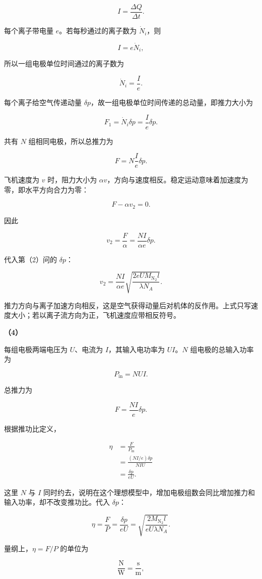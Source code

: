 \documentclass[12pt,a4paper,UTF8]{ctexart}
\begin{document}
\[I=\frac{\Delta Q}{\Delta t}.\]

每个离子带电量 \(e\)。若每秒通过的离子数为 \(\dot N_i\)，则

\[I=e\dot N_i,\]

所以一组电极单位时间通过的离子数为

\[\dot N_i=\frac Ie.\]

每个离子给空气传递动量
\(\delta p\)，故一组电极单位时间传递的总动量，即推力大小为

\[F_1=\dot N_i\delta p=\frac Ie\delta p.\]

共有 \(N\) 组相同电极，所以总推力为

\[F=N\frac{I}{e}\delta p.\]

飞机速度为 \(v\) 时，阻力大小为
\(\alpha v\)，方向与速度相反。稳定运动意味着加速度为零，即水平方向合力为零：

\[F-\alpha v_2=0.\]

因此

\[v_2=\frac F\alpha
=\frac{NI}{\alpha e}\delta p.\]

代入第（2）问的 \(\delta p\)：

\[\boxed{
v_2=\frac{NI}{\alpha e}
\sqrt{\frac{2eUM_{\mathrm{N_2}}l}{\lambda N_A}}
}.\]

推力方向与离子加速方向相反，这是空气获得动量后对机体的反作用。上式只写速度大小；若以离子流方向为正，飞机速度应带相反符号。

\textbf{（4）}

每组电极两端电压为 \(U\)、电流为 \(I\)，其输入电功率为 \(UI\)。\(N\)
组电极的总输入功率为

\[P_{\mathrm{in}}=NUI.\]

总推力为

\[F=\frac{NI}{e}\delta p.\]

根据推功比定义，

\[\begin{aligned}
\eta
&=\frac{F}{P_{\mathrm{in}}}\\
&=\frac{(NI/e)\delta p}{NIU}\\
&=\frac{\delta p}{eU}.
\end{aligned}\]

这里 \(N\) 与 \(I\)
同时约去，说明在这个理想模型中，增加电极组数会同比增加推力和输入功率，却不改变推功比。代入
\(\delta p\)：

\[\eta=\frac{F}{P}
=\frac{\delta p}{eU}
=\boxed{\sqrt{\frac{2M_{\mathrm{N_2}}l}{eU\lambda N_A}}}.\]

量纲上，\(\eta=F/P\) 的单位为

\[\frac{\mathrm N}{\mathrm W}
=\frac{\mathrm s}{\mathrm m},\]
\end{document}
